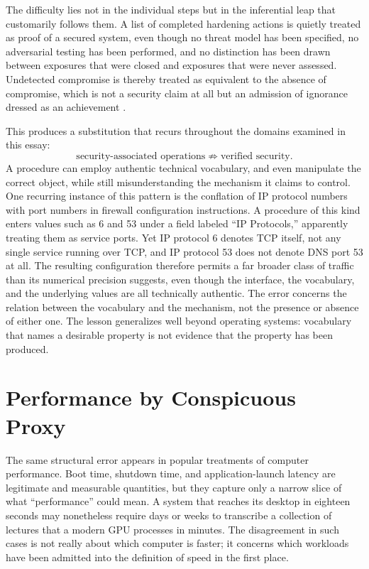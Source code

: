 \documentclass[11pt]{article}
\begin{document}
The difficulty lies not in the individual steps but in the inferential leap that customarily follows them. A list of completed hardening actions is quietly treated as proof of a secured system, even though no threat model has been specified, no adversarial testing has been performed, and no distinction has been drawn between exposures that were closed and exposures that were never assessed. Undetected compromise is thereby treated as equivalent to the absence of compromise, which is not a security claim at all but an admission of ignorance dressed as an achievement \cite{scarfone2008testing}.

This produces a substitution that recurs throughout the domains examined in this essay:
\[
\text{security-associated operations} \not\Rightarrow \text{verified security}.
\]
A procedure can employ authentic technical vocabulary, and even manipulate the correct object, while still misunderstanding the mechanism it claims to control. One recurring instance of this pattern is the conflation of IP protocol numbers with port numbers in firewall configuration instructions. A procedure of this kind enters values such as 6 and 53 under a field labeled ``IP Protocols,'' apparently treating them as service ports. Yet IP protocol 6 denotes TCP itself, not any single service running over TCP, and IP protocol 53 does not denote DNS port 53 at all. The resulting configuration therefore permits a far broader class of traffic than its numerical precision suggests, even though the interface, the vocabulary, and the underlying values are all technically authentic. The error concerns the relation between the vocabulary and the mechanism, not the presence or absence of either one. The lesson generalizes well beyond operating systems: vocabulary that names a desirable property is not evidence that the property has been produced.

\section{Performance by Conspicuous Proxy}

The same structural error appears in popular treatments of computer performance. Boot time, shutdown time, and application-launch latency are legitimate and measurable quantities, but they capture only a narrow slice of what ``performance'' could mean. A system that reaches its desktop in eighteen seconds may nonetheless require days or weeks to transcribe a collection of lectures that a modern GPU processes in minutes. The disagreement in such cases is not really about which computer is faster; it concerns which workloads have been admitted into the definition of speed in the first place.
\end{document}
